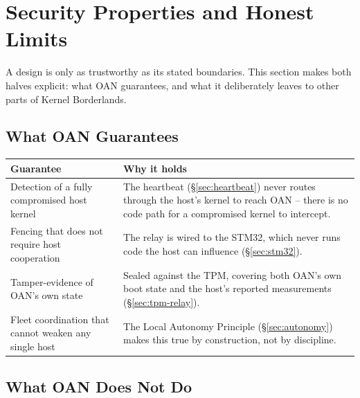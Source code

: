 \documentclass[11pt,a4paper]{article}
\begin{document}
\section{Security Properties and Honest Limits}
\label{sec:properties}

A design is only as trustworthy as its stated boundaries. This section
makes both halves explicit: what OAN guarantees, and what it
deliberately leaves to other parts of Kernel Borderlands.

\subsection{What OAN Guarantees}

\begin{center}
\renewcommand{\arraystretch}{1.35}
\small
\begin{tabular}{@{}p{5.4cm}p{8.2cm}@{}}
\toprule
\textbf{Guarantee} & \textbf{Why it holds} \\
\midrule
Detection of a fully compromised host kernel & The heartbeat
(\S\ref{sec:heartbeat}) never routes through the host's kernel to
reach OAN -- there is no code path for a compromised kernel to
intercept. \\
Fencing that does not require host cooperation & The relay is wired to
the STM32, which never runs code the host can influence
(\S\ref{sec:stm32}). \\
Tamper-evidence of OAN's own state & Sealed against the TPM, covering
both OAN's own boot state and the host's reported measurements
(\S\ref{sec:tpm-relay}). \\
Fleet coordination that cannot weaken any single host & The Local
Autonomy Principle (\S\ref{sec:autonomy}) makes this true by
construction, not by discipline. \\
\bottomrule
\end{tabular}
\end{center}

\subsection{What OAN Does Not Do}
\end{document}
